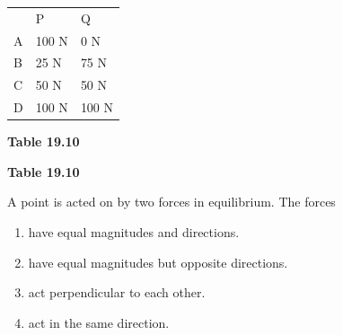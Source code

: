           \begin{table}[H]
        \begin{center}
      \label{m38819*id197541}
    \noindent
      \tablelasttail{}
      \begin{xtabular}[t]{|l|l|l|}\hline
         &
        P &
        Q%
     \tabularnewline{}
        A &
        100 N &
        0 N%
     \tabularnewline{}
        B &
        25 N &
        75 N%
     \tabularnewline{}
        C &
        50 N &
        50 N%
     \tabularnewline{}
        D &
        100 N &
        100 N%
     \tabularnewline{}
    \end{xtabular}
      \end{center}
    \begin{center}{\small\bfseries Table 19.10}\end{center}
    \begin{caption}{\small\bfseries Table 19.10}\end{caption}
\end{table}
    \par
          \label{m38819*uid92}\item A point is acted on by two forces in equilibrium. The forces
\label{m38819*id197705}\begin{enumerate}[noitemsep, label=\textbf{\alph*}. ] 
            \label{m38819*uid93}\item have equal magnitudes and directions.
\label{m38819*uid94}\item have equal magnitudes but opposite directions.
\label{m38819*uid95}\item act perpendicular to each other.
\label{m38819*uid96}\item act in the same direction.
\end{enumerate}
